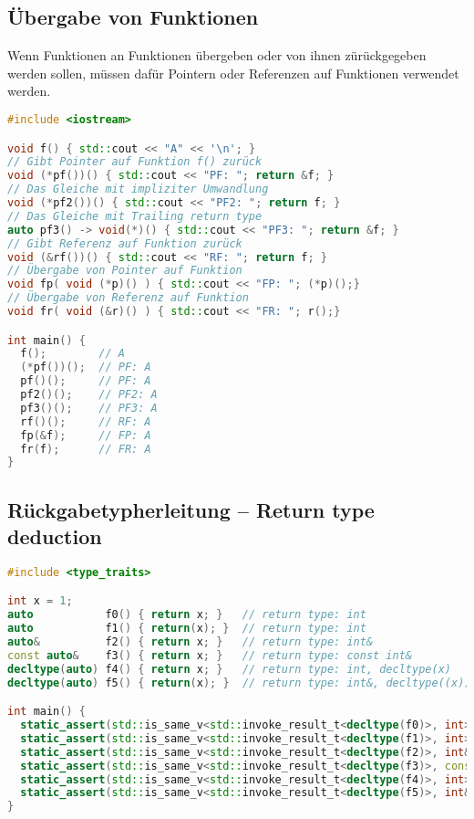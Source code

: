 \subsection{Übergabe von Funktionen}

Wenn Funktionen an Funktionen übergeben oder von ihnen zürückgegeben werden
sollen, müssen dafür Pointern oder Referenzen auf Funktionen verwendet werden.

\begin{lstlisting}[language=C++]
#include <iostream>

void f() { std::cout << "A" << '\n'; }
// Gibt Pointer auf Funktion f() zurück
void (*pf())() { std::cout << "PF: "; return &f; }
// Das Gleiche mit impliziter Umwandlung
void (*pf2())() { std::cout << "PF2: "; return f; }
// Das Gleiche mit Trailing return type
auto pf3() -> void(*)() { std::cout << "PF3: "; return &f; }
// Gibt Referenz auf Funktion zurück
void (&rf())() { std::cout << "RF: "; return f; }
// Übergabe von Pointer auf Funktion
void fp( void (*p)() ) { std::cout << "FP: "; (*p)();}
// Übergabe von Referenz auf Funktion
void fr( void (&r)() ) { std::cout << "FR: "; r();}

int main() {
  f();        // A
  (*pf())();  // PF: A
  pf()();     // PF: A
  pf2()();    // PF2: A
  pf3()();    // PF3: A
  rf()();     // RF: A
  fp(&f);     // FP: A
  fr(f);      // FR: A
}
\end{lstlisting}

\subsection{Rückgabetypherleitung --  Return type deduction}

\begin{lstlisting}[basicstyle=\ttfamily\footnotesize,language=C++]
#include <type_traits>

int x = 1;
auto           f0() { return x; }   // return type: int
auto           f1() { return(x); }  // return type: int
auto&          f2() { return x; }   // return type: int&
const auto&    f3() { return x; }   // return type: const int&
decltype(auto) f4() { return x; }   // return type: int, decltype(x)
decltype(auto) f5() { return(x); }  // return type: int&, decltype((x))

int main() {
  static_assert(std::is_same_v<std::invoke_result_t<decltype(f0)>, int>);
  static_assert(std::is_same_v<std::invoke_result_t<decltype(f1)>, int>);
  static_assert(std::is_same_v<std::invoke_result_t<decltype(f2)>, int&>);
  static_assert(std::is_same_v<std::invoke_result_t<decltype(f3)>, const int&>);
  static_assert(std::is_same_v<std::invoke_result_t<decltype(f4)>, int>);
  static_assert(std::is_same_v<std::invoke_result_t<decltype(f5)>, int&>);
}
\end{lstlisting}

